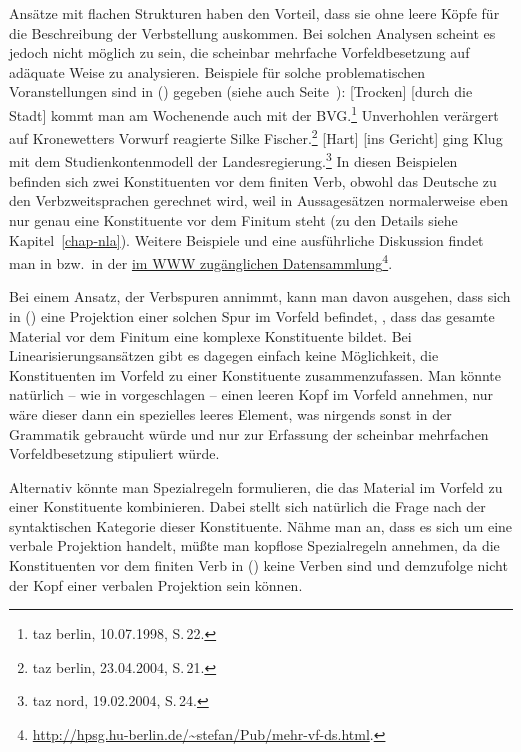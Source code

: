 Ansätze mit flachen Strukturen haben den Vorteil, dass sie ohne leere Köpfe für die Beschreibung der
Verbstellung auskommen. Bei solchen Analysen scheint es jedoch nicht möglich zu sein, die scheinbar
mehrfache Vorfeldbesetzung \citep{Mueller2005d} auf adäquate Weise zu analysieren. Beispiele für
solche problematischen Voranstellungen sind in () gegeben (siehe auch Seite~\pageref{bsp-mehr-vf}):
\eal
\label{bsp-smvfb}
\ex {}[Trocken] [durch die Stadt] kommt man am Wochenende auch mit der BVG.\footnote{
        taz berlin, 10.07.1998, S.\,22.
      }
\ex Unverhohlen verärgert auf Kronewetters Vorwurf reagierte Silke Fischer.\footnote{
    taz berlin, 23.04.2004, S.\,21.
}
\ex {}[Hart] [ins Gericht] ging Klug mit dem Studienkontenmodell der Landesregierung.\footnote{
  taz nord, 19.02.2004, S.\,24.
  }
\zl
In diesen Beispielen befinden sich zwei Konstituenten vor dem finiten Verb, obwohl das Deutsche
zu den Verbzweitsprachen gerechnet wird, weil in Aussagesätzen
normalerweise eben nur genau eine Konstituente vor dem Finitum steht (zu den Details siehe Kapitel~\ref{chap-nla}).
Weitere Beispiele und eine ausführliche Diskussion findet man in 
bzw.\ in der \href{http://hpsg.hu-berlin.de/~stefan/Pub/mehr-vf-ds.html}{im WWW zugänglichen Datensammlung}\footnote{
  \url{http://hpsg.hu-berlin.de/~stefan/Pub/mehr-vf-ds.html}.%
}.

Bei einem Ansatz, der Verbspuren annimmt, kann man davon ausgehen, dass sich in () eine Projektion
einer solchen Spur im Vorfeld befindet, \dash, dass das gesamte Material vor dem Finitum eine komplexe Konstituente
bildet. Bei Linearisierungsansätzen gibt es dagegen einfach keine Möglichkeit, 
die Konstituenten im Vorfeld zu einer Konstituente zusammenzufassen. Man
könnte natürlich -- wie in  vorgeschlagen 
-- einen leeren Kopf im Vorfeld annehmen, nur wäre dieser dann ein spezielles leeres Element,
was nirgends sonst in der Grammatik gebraucht würde
und nur zur Erfassung der scheinbar mehrfachen Vorfeldbesetzung stipuliert würde.

Alternativ könnte man Spezialregeln formulieren, die das Material
im Vorfeld zu einer Konstituente kombinieren. Dabei stellt sich natürlich die Frage nach
der syntaktischen Kategorie dieser Konstituente. Nähme man an, dass es sich um eine verbale
Projektion handelt, müßte man kopflose Spezialregeln annehmen, da die Konstituenten vor dem finiten
Verb in () keine Verben sind und demzufolge nicht der Kopf einer verbalen Projektion sein
können.

